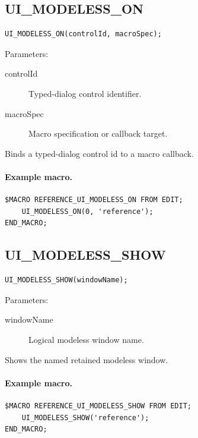 \documentclass[a4paper,10pt,twoside,openany]{book}
\newenvironment{mrmacextension}{\begin{changebar}}{\end{changebar}}
\begin{document}
\begin{mrmacextension}
\label{prim:procedure-ui-modeless-on}
\subsection*{UI\_MODELESS\_ON}
\begin{verbatim}
UI_MODELESS_ON(controlId, macroSpec);
\end{verbatim}
Parameters:
\begin{description}
\item[controlId] Typed-dialog control identifier.
\item[macroSpec] Macro specification or callback target.
\end{description}

Binds a typed-dialog control id to a macro callback.

\paragraph{Example macro.}
\begin{verbatim}
$MACRO REFERENCE_UI_MODELESS_ON FROM EDIT;
    UI_MODELESS_ON(0, 'reference');
END_MACRO;
\end{verbatim}
\end{mrmacextension}

\begin{mrmacextension}
\label{prim:procedure-ui-modeless-show}
\subsection*{UI\_MODELESS\_SHOW}
\begin{verbatim}
UI_MODELESS_SHOW(windowName);
\end{verbatim}
Parameters:
\begin{description}
\item[windowName] Logical modeless window name.
\end{description}

Shows the named retained modeless window.

\paragraph{Example macro.}
\begin{verbatim}
$MACRO REFERENCE_UI_MODELESS_SHOW FROM EDIT;
    UI_MODELESS_SHOW('reference');
END_MACRO;
\end{verbatim}
\end{mrmacextension}
\end{document}
